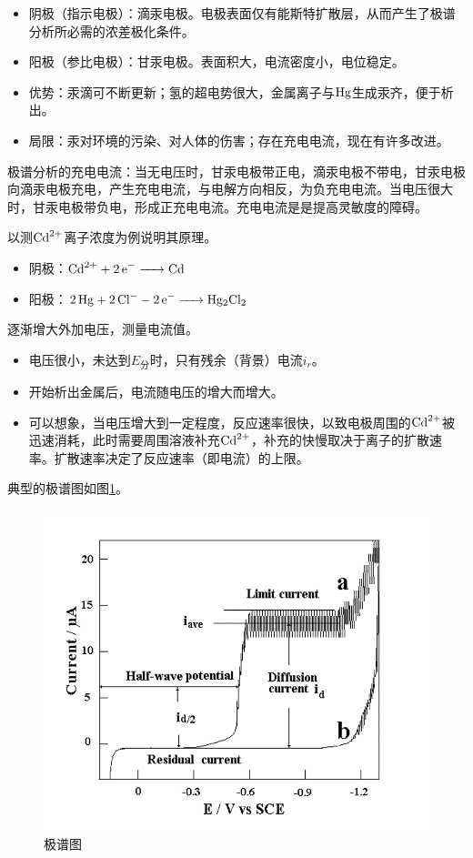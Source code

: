 \begin{itemize}
	\item 阴极（指示电极）：滴汞电极。电极表面仅有能斯特扩散层，从而产生了极谱分析所必需的浓差极化条件。
	\item 阳极（参比电极）：甘汞电极。表面积大，电流密度小，电位稳定。
	\item 优势：汞滴可不断更新；氢的超电势很大，金属离子与$\ce{Hg}$生成汞齐，便于析出。
	\item 局限：汞对环境的污染、对人体的伤害；存在充电电流，现在有许多改进。
\end{itemize}

\begin{note}
	极谱分析的充电电流：当无电压时，甘汞电极带正电，滴汞电极不带电，甘汞电极向滴汞电极充电，产生充电电流，与电解方向相反，为负充电电流。当电压很大时，甘汞电极带负电，形成正充电电流。充电电流是是提高灵敏度的障碍。
\end{note}

\begin{example}
	以测$\ce{Cd^2+}$离子浓度为例说明其原理。
	
	\begin{itemize}
		\item 阴极：$\ce{Cd^2+ + 2e- -> Cd}$
		\item 阳极：$\ce{2Hg + 2Cl- - 2e- -> Hg2Cl2}$
	\end{itemize}

	逐渐增大外加电压，测量电流值。
	
	\begin{itemize}
		\item 电压很小，未达到$E_{\text{分}}$时，只有残余（背景）电流$i_r$。
		\item 开始析出金属后，电流随电压的增大而增大。
		\item 可以想象，当电压增大到一定程度，反应速率很快，以致电极周围的$\ce{Cd^2+}$被迅速消耗，此时需要周围溶液补充$\ce{Cd^2+}$，补充的快慢取决于离子的扩散速率。扩散速率决定了反应速率（即电流）的上限。
	\end{itemize}

	典型的极谱图如图\ref{fig:chp7jipufenxiivfigure}。
\end{example}

\begin{figure}[!h]
	\centering
	\includegraphics[width=0.7\linewidth]{image/chp7_jipufenxi_IVfigure}
	\caption{极谱图}
	\label{fig:chp7jipufenxiivfigure}
\end{figure}

